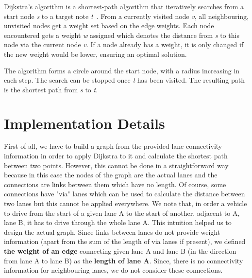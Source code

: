 Dijkstra's algorithm is a shortest-path algorithm that iteratively searches from a start node \emph{s} to a target note \emph{t}~\cite{skiena1998algorithm}. From a currently visited node \emph{v}, all neighbouring, unvisited nodes get a weight set based on the edge weights. Each node encountered gets a weight \emph{w} assigned which denotes the distance from \emph{s} to this node via the current node \emph{v}. If a node already has a weight, it is only changed if the new weight would be lower, ensuring an optimal solution.

The algorithm forms a circle around the start node, with a radius increasing in each step. The search can be stopped once \emph{t} has been visited. The resulting path is the shortest path from \emph{s} to \emph{t}.

\section{Implementation Details}
First of all, we have to build a graph from the provided lane connectivity information in order to apply Dijkstra to it and calculate the shortest path between two points. However, this cannot be done in a straightforward way because in this case the nodes of the graph are the actual lanes and the connections are links between them which have no length. Of course, some connections have "via" lanes which can be used to calculate the distance between two lanes but this cannot be applied everywhere. We note that, in order a vehicle to drive from the start of a given lane A to the start of another, adjacent to A, lane B, it has to drive through the whole lane A. This intuition helped us to design the actual graph. Since links between lanes do not provide weight information (apart from the sum of the length of via lanes if present), we defined \textbf{the weight of an edge} connecting given lane A and lane B (in the direction from lane A to lane B) as the \textbf{length of lane A}. Since, there is no connectivity information for neighbouring lanes, we do not consider these connections.

